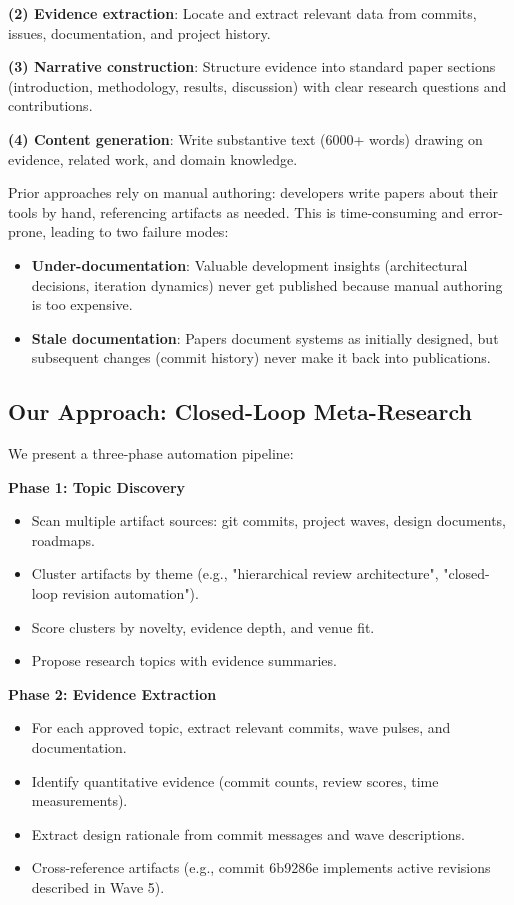 \textbf{(2) Evidence extraction}: Locate and extract relevant data from commits, issues, documentation, and project history.

\textbf{(3) Narrative construction}: Structure evidence into standard paper sections (introduction, methodology, results, discussion) with clear research questions and contributions.

\textbf{(4) Content generation}: Write substantive text (6000+ words) drawing on evidence, related work, and domain knowledge.

Prior approaches rely on manual authoring: developers write papers about their tools by hand, referencing artifacts as needed. This is time-consuming and error-prone, leading to two failure modes:
\begin{itemize}
\item \textbf{Under-documentation}: Valuable development insights (architectural decisions, iteration dynamics) never get published because manual authoring is too expensive.
\item \textbf{Stale documentation}: Papers document systems as initially designed, but subsequent changes (commit history) never make it back into publications.
\end{itemize}

\subsection{Our Approach: Closed-Loop Meta-Research}

We present a three-phase automation pipeline:

\textbf{Phase 1: Topic Discovery}
\begin{itemize}
\item Scan multiple artifact sources: git commits, project waves, design documents, roadmaps.
\item Cluster artifacts by theme (e.g., "hierarchical review architecture", "closed-loop revision automation").
\item Score clusters by novelty, evidence depth, and venue fit.
\item Propose research topics with evidence summaries.
\end{itemize}

\textbf{Phase 2: Evidence Extraction}
\begin{itemize}
\item For each approved topic, extract relevant commits, wave pulses, and documentation.
\item Identify quantitative evidence (commit counts, review scores, time measurements).
\item Extract design rationale from commit messages and wave descriptions.
\item Cross-reference artifacts (e.g., commit 6b9286e implements active revisions described in Wave 5).
\end{itemize}

